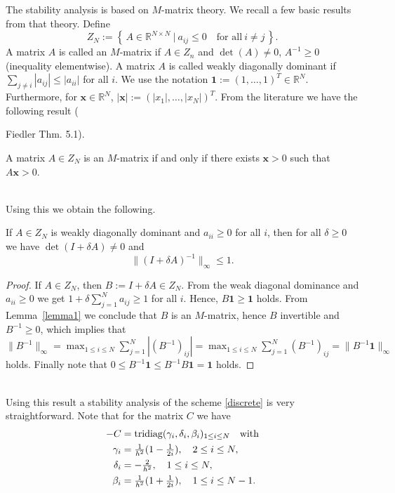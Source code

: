 \documentclass{siamltex}
\newcommand{\R}{\mathbb{R}}
\newcommand{\bx}{\mathbf x}
\newcommand{\bfone}{\mathbf{1}}
\begin{document}
The stability analysis is based on $M$-matrix theory. We recall a few basic results from that theory. Define 
\[
  Z_N:=\left\{ \, A \in \R^{N \times N}~|~ a_{ij} \leq 0 \quad \text{for all}~i\neq j\,\right\}.
\]
A matrix $A$ is called an $M$-matrix if $A \in Z_n$ and $\det(A) \neq 0 $, $A^{-1} \geq 0 $ (inequality elementwise).
A matrix $A$ is called  weakly diagonally dominant if $\sum_{j \neq i} |a_{ij}| \leq |a_{ii}|$ for all $i$. We use the notation $\bfone:=(1,\ldots,1)^T  \in \R^N$. Furthermore, for $\bx \in \R^N$, $|\bx|:=(|x_1|, \ldots, |x_N|)^T$. From the literature we have the following result ({Fiedler Thm. 5.1).
\begin{lemma} \label{lemma1}
A matrix $A \in Z_N$ is an $M$-matrix if and only if there exists $\bx > 0$ such that $A \bx >0$.
\end{lemma}
\ \\
Using this we obtain the following.
\begin{lemma} \label{lemma2}
 If $A \in Z_N$ is weakly diagonally dominant and $a_{ii} \geq 0$ for all $i$, then for all $\delta \geq 0$ we have $\det(I+\delta A) \neq 0$ and
 \[
   \|(I+ \delta A)^{-1}\|_\infty \leq 1.
 \]
\end{lemma}
\begin{proof} If $A \in Z_N$, then $B:=I+\delta A \in Z_N$. From the weak diagonal dominance and $a_{ii} \geq 0$ we get $1+\delta \sum_{j=1}^N a_{ij} \geq 1$ for all $i$. Hence, $B\bfone \geq \bfone$ holds. From Lemma~\ref{lemma1} we conclude that $B$ is an $M$-matrix, hence $B$ invertible and $B^{-1} \geq 0$, which implies that $\|B^{-1}\|_\infty =\max_{1 \leq i \leq N} \sum_{j=1}^N\left| (B^{-1})_{ij}\right|=\max_{1 \leq i \leq N} \sum_{j=1}^N (B^{-1})_{ij} =\|B^{-1} \bfone \|_\infty$ holds. Finally note that $0 \leq   B^{-1} \bfone \leq B^{-1} B\bfone = \bfone$ holds.  
\end{proof}
\ \\
Using this result a stability analysis of the scheme \eqref{discrete} is very straightforward. Note that for the matrix $C$ we have
\begin{align*}
  -C &= {\rm tridiag}(\gamma_i,\delta_i,\beta_i)_{1 \leq i \leq N} \quad \text{with} \\
  \gamma_i &= \tfrac{1}{h^2}(1-\tfrac{1}{2i}), \quad 2 \leq i \leq N, \\
  \delta_i &= - \tfrac{2}{h^2}, \quad 1 \leq i \leq N, \\ 
  \beta_i & = \tfrac{1}{h^2} (1 +\tfrac{1}{2i}), \quad 1 \leq i \leq N-1.
  \end{align*}
}
\end{document}
